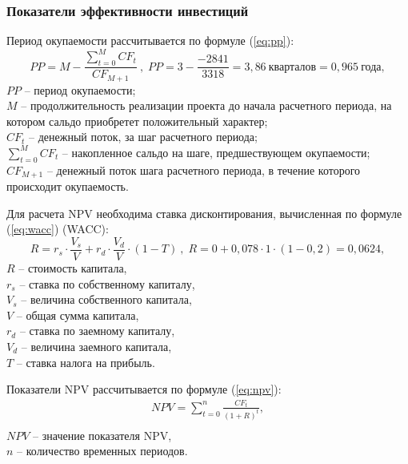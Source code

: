 \documentclass[../main]{subfiles}
\begin{document}
\subsubsection{Показатели эффективности инвестиций}
Период окупаемости рассчитывается по формуле (\ref{eq:pp}):
\begin{equation}
    \label{eq:pp}
    PP = M - \frac{\sum^{M}_{t=0}CF_t}{CF_{M+1}}\ ,\; PP = 3 - \frac{-2 841}{3 318} = 3{,}86\:\text{кварталов} = 0,965\:\text{года},
\end{equation}
$PP$ -- период окупаемости;\\
\makebox[1.25cm]{}$M$ -- продолжительность реализации проекта до начала расчетного периода, на котором сальдо приобретет положительный характер;\\
\makebox[1.25cm]{}$CF_t$ -- денежный поток, за шаг расчетного периода;\\
\makebox[1.25cm]{}$\sum^M_{t=0}CF_t$ -- накопленное сальдо на шаге, предшествующем окупаемости;\\
\makebox[1.25cm]{}$CF_{M+1}$ -- денежный поток шага расчетного периода, в течение которого происходит окупаемость.

Для расчета NPV необходима ставка дисконтирования, вычисленная по формуле (\ref{eq:wacc}) (WACC):
\begin{equation}
    \label{eq:wacc}
    R = r_s \cdot \frac{V_s}{V} + r_d \cdot \frac{V_d}{V} \cdot (1-T)\ ,\; R = 0 + 0{,}078 \cdot 1 \cdot (1-0{,}2) = 0{,}0624,
\end{equation}
$R$ -- стоимость капитала,\\
\makebox[1.25cm]{}$r_s$ -- ставка по собственному капиталу,\\
\makebox[1.25cm]{}$V_s$ -- величина собственного капитала,\\
\makebox[1.25cm]{}$V$ -- общая сумма капитала,\\
\makebox[1.25cm]{}$r_d$ -- ставка по заемному капиталу,\\
\makebox[1.25cm]{}$V_d$ -- величина заемного капитала,\\
\makebox[1.25cm]{}$T$ -- ставка налога на прибыль.

Показатели NPV рассчитывается по формуле (\ref{eq:npv}):
\begin{equation}
    \label{eq:npv}
    \begin{gathered}
    NPV = \sum^n_{t=0}\frac{CF_t}{(1 + R)^t},\\
    \end{gathered}
\end{equation}
$NPV$ -- значение показателя NPV,\\
\makebox[1.25cm]{}$n$ -- количество временных периодов.
\end{document}
